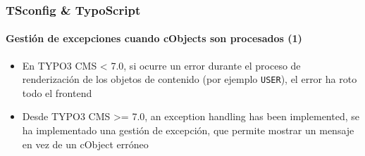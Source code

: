 
\begin{frame}[fragile]
	\frametitle{TSconfig \& TypoScript}
	\framesubtitle{Gestión de excepciones cuando cObjects son procesados (1)}

	\begin{itemize}
		\item En TYPO3 CMS < 7.0, si ocurre un error durante el proceso de renderización de los objetos de contenido (por ejemplo \texttt{USER}), el error ha roto todo el frontend
		\item Desde TYPO3 CMS >= 7.0, an exception handling has been implemented, se ha implementado una gestión de excepción, que permite mostrar un mensaje en vez de un cObject erróneo
	\end{itemize}

%

\end{frame}


